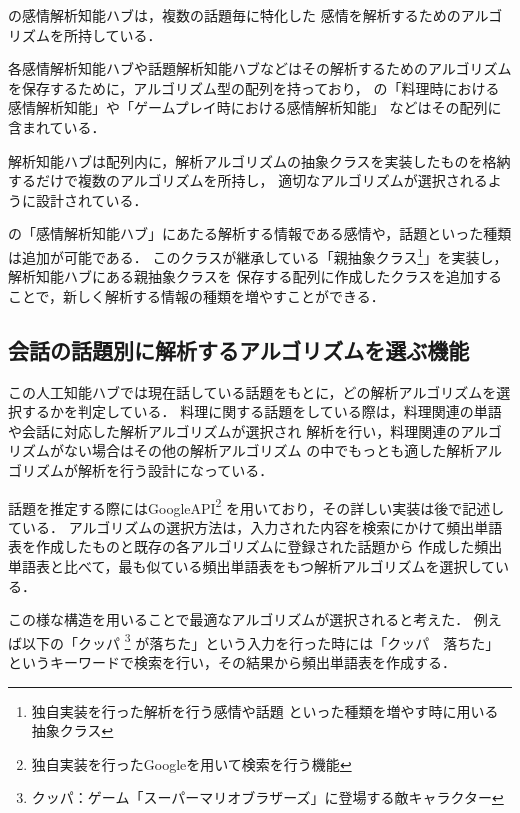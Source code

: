 
の感情解析知能ハブは，複数の話題毎に特化した
感情を解析するためのアルゴリズムを所持している．

各感情解析知能ハブや話題解析知能ハブなどはその解析するためのアルゴリズムを保存するために，アルゴリズム型の配列を持っており，
の「料理時における感情解析知能」や「ゲームプレイ時における感情解析知能」
などはその配列に含まれている．

解析知能ハブは配列内に，解析アルゴリズムの抽象クラスを実装したものを格納するだけで複数のアルゴリズムを所持し，
適切なアルゴリズムが選択されるように設計されている．

の「感情解析知能ハブ」にあたる解析する情報である感情や，話題といった種類
は追加が可能である．
このクラスが継承している「親抽象クラス\footnote{独自実装を行った解析を行う感情や話題
といった種類を増やす時に用いる抽象クラス}」を実装し，解析知能ハブにある親抽象クラスを
保存する配列に作成したクラスを追加することで，新しく解析する情報の種類を増やすことができる．

\subsection{会話の話題別に解析するアルゴリズムを選ぶ機能}
この人工知能ハブでは現在話している話題をもとに，どの解析アルゴリズムを選択するかを判定している．
料理に関する話題をしている際は，料理関連の単語や会話に対応した解析アルゴリズムが選択され
解析を行い，料理関連のアルゴリズムがない場合はその他の解析アルゴリズム
の中でもっとも適した解析アルゴリズムが解析を行う設計になっている．

話題を推定する際にはGoogleAPI\footnote{独自実装を行ったGoogleを用いて検索を行う機能}
を用いており，その詳しい実装は後で記述している．
アルゴリズムの選択方法は，入力された内容を検索にかけて頻出単語表を作成したものと既存の各アルゴリズムに登録された話題から
作成した頻出単語表と比べて，最も似ている頻出単語表をもつ解析アルゴリズムを選択している．

この様な構造を用いることで最適なアルゴリズムが選択されると考えた．
例えば以下の「クッパ
	\footnote{クッパ：ゲーム「スーパーマリオブラザーズ」に登場する敵キャラクター}
が落ちた」という入力を行った時には「クッパ　落ちた」というキーワードで検索を行い，その結果から頻出単語表を作成する．


